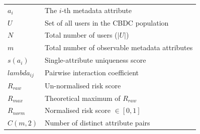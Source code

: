 \documentclass[12pt,a4paper,oneside,openany]{report}
\def\mathrm#1{#1}%
\def\lambda{lambda}%
\def\binom#1#2{C(#1,#2)}%
\begin{document}
\begin{tabular}{ll}
$a_i$              & The $i$-th metadata attribute\\
$U$                & Set of all users in the CBDC population\\
$N$                & Total number of users ($|U|$)\\
$m$                & Total number of observable metadata attributes\\
$s(a_i)$           & Single-attribute uniqueness score\\
$\lambda_{ij}$     & Pairwise interaction coefficient\\
$R_{\mathrm{raw}}$ & Un-normalised risk score\\
$R_{\mathrm{max}}$ & Theoretical maximum of $R_{\mathrm{raw}}$\\
$R_{\mathrm{norm}}$ & Normalised risk score $\in [0,1]$\\
$\binom{m}{2}$     & Number of distinct attribute pairs\\
\end{tabular}
\clearpage
{}
\pagestyle{fancy}
\clearpage





\newpage
{}
{}

\def\appendixname{Appendix}
\appendix

\end{document}
